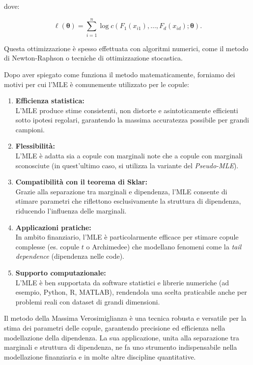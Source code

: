\documentclass[a4paper,12pt]{article}
\begin{document}
\begin{itemize}
\begin{enumerate}
		dove:
		
		\[
		\ell(\boldsymbol{\theta}) = \sum_{i=1}^n \log c(F_1(x_{i1}), \ldots, F_d(x_{id}); \boldsymbol{\theta}).
		\]
		
		Questa ottimizzazione è spesso effettuata con algoritmi numerici, come il metodo di Newton-Raphson o tecniche di ottimizzazione stocastica.
		
	\end{enumerate}
	Dopo aver spiegato come funziona il metodo matematicamente, forniamo dei motivi per cui l'MLE è comunemente utilizzato per le copule:
	\begin{enumerate}
		\item \textbf{Efficienza statistica:}\\
		L'MLE produce stime consistenti, non distorte e asintoticamente efficienti sotto ipotesi regolari, garantendo la massima accuratezza possibile per grandi campioni.
		
		\item \textbf{Flessibilità:}\\
		L'MLE è adatta sia a copule con marginali note che a copule con marginali sconosciute (in quest'ultimo caso, si utilizza la variante del \textit{Pseudo-MLE}).
		
		\item \textbf{Compatibilità con il teorema di Sklar:}\\
		Grazie alla separazione tra marginali e dipendenza, l'MLE consente di stimare parametri che riflettono esclusivamente la struttura di dipendenza, riducendo l'influenza delle marginali.
		
		\item \textbf{Applicazioni pratiche:}\\
		In ambito finanziario, l'MLE è particolarmente efficace per stimare copule complesse (es. copule \(t\) o Archimedee) che modellano fenomeni come la \textit{tail dependence} (dipendenza nelle code).
		
		\item \textbf{Supporto computazionale:}\\
		L'MLE è ben supportata da software statistici e librerie numeriche (ad esempio, Python, R, MATLAB), rendendola una scelta praticabile anche per problemi reali con dataset di grandi dimensioni.
	\end{enumerate}
	Il metodo della Massima Verosimiglianza è una tecnica robusta e versatile per la stima dei parametri delle copule, garantendo precisione ed efficienza nella modellazione della dipendenza. La sua applicazione, unita alla separazione tra marginali e struttura di dipendenza, ne fa uno strumento indispensabile nella modellazione finanziaria e in molte altre discipline quantitative.\\
	

\end{itemize}
\end{document}
